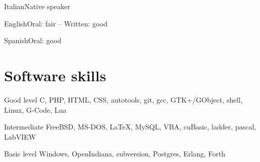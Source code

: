 \documentclass[fontsize=10pt]{tccv}
\begin{document}
\begin{factlist}
\item{Italian}{Native speaker}
\item{English}{Oral: fair -- Written: good}
\item{Spanish}{Oral: good}
\end{factlist}

\section{Software skills}

\begin{factlist}

\item{Good level}
     {C, PHP, HTML, CSS, autotools, git, gcc, GTK+/GObject, shell,
      Linux, G-Code, Lua}

\item{Intermediate}
     {FreeBSD, MS-DOS, \LaTeX, MySQL, VBA, cuBasic, ladder, pascal,
      LabVIEW}

\item{Basic level}
     {Windows, OpenIndiana, subversion,  Postgres, Erlang, Forth}

\end{factlist}
\end{document}
